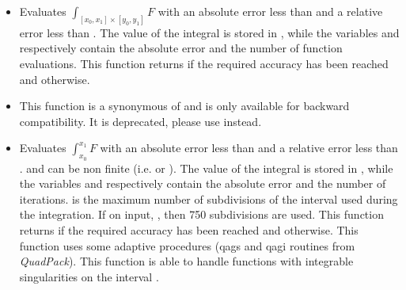 \begin{itemize}
\item {}
  \sshortdescribe Evaluates $\int_{[x_0, x_1] \times [y_0, y_1]} F$ with an
  absolute error less than  and a relative error less than
  . The value of the integral is stored in , while the
  variables  and  respectively contain the absolute error
  and the number of function evaluations. This function returns  if the
  required accuracy has been reached and  otherwise.

\item {}
  \sshortdescribe This function is a synonymous of
   and is only available for backward
  compatibility. It is deprecated, please use 
  instead.

\item {}
  \sshortdescribe Evaluates $\int_{x_0}^{x_1} F$ with an absolute error less
  than  and a relative error less than .  and
   can be non finite (i.e.  or ). The
  value of the integral is stored in , while the variables
   and  respectively contain the absolute error and the
  number of iterations.  is the maximum number of subdivisions of the
  interval  used during the integration. If on input, , then 750 subdivisions are used.  This function returns  if the
  required accuracy has been reached and  otherwise. This function
  uses some adaptive procedures (qags and qagi routines from {\it QuadPack}).
  This function is able to handle functions  with integrable
  singularities on the interval \var{[x0,x1]}.


\end{itemize}
